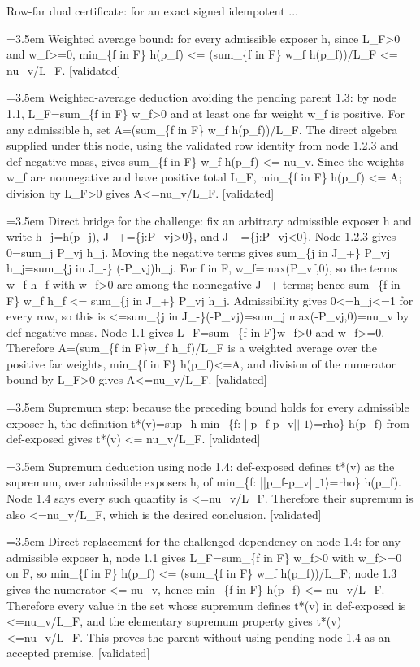 \documentclass{article}
\newcommand{\step}[1]{\par\noindent\hangindent=3.5em\hangafter=1%
  \makebox[3.5em][l]{\textbf{#1.}}}
\newcommand{\steptag}[1]{\hfill{\small\textsf{[#1]}}}
\begin{document}
\begin{proofbox}{Row-far dual certificate: for an exact signed idempotent ...}
\step{1.4} Weighted average bound: for every admissible exposer h, since L\_F>0 and w\_f>=0, min\_\{f in F\} h(p\_f) <= (sum\_\{f in F\} w\_f h(p\_f))/L\_F <= nu\_v/L\_F. \steptag{validated} \\[6pt]
\step{1.4.1} Weighted-average deduction avoiding the pending parent 1.3: by node 1.1, L\_F=sum\_\{f in F\} w\_f>0 and at least one far weight w\_f is positive. For any admissible h, set A=(sum\_\{f in F\} w\_f h(p\_f))/L\_F. The direct algebra supplied under this node, using the validated row identity from node 1.2.3 and def-negative-mass, gives sum\_\{f in F\} w\_f h(p\_f) <= nu\_v. Since the weights w\_f are nonnegative and have positive total L\_F, min\_\{f in F\} h(p\_f) <= A; division by L\_F>0 gives A<=nu\_v/L\_F. \steptag{validated} \\[6pt]
\step{1.4.1.1} Direct bridge for the challenge: fix an arbitrary admissible exposer h and write h\_j=h(p\_j), J\_+=\{j:P\_vj>0\}, and J\_-=\{j:P\_vj<0\}. Node 1.2.3 gives 0=sum\_j P\_vj h\_j. Moving the negative terms gives sum\_\{j in J\_+\} P\_vj h\_j=sum\_\{j in J\_-\} (-P\_vj)h\_j. For f in F, w\_f=max(P\_vf,0), so the terms w\_f h\_f with w\_f>0 are among the nonnegative J\_+ terms; hence sum\_\{f in F\} w\_f h\_f <= sum\_\{j in J\_+\} P\_vj h\_j. Admissibility gives 0<=h\_j<=1 for every row, so this is <=sum\_\{j in J\_-\}(-P\_vj)=sum\_j max(-P\_vj,0)=nu\_v by def-negative-mass. Node 1.1 gives L\_F=sum\_\{f in F\}w\_f>0 and w\_f>=0. Therefore A=(sum\_\{f in F\}w\_f h\_f)/L\_F is a weighted average over the positive far weights, min\_\{f in F\} h(p\_f)<=A, and division of the numerator bound by L\_F>0 gives A<=nu\_v/L\_F. \steptag{validated} \\[4pt]
\step{1.5} Supremum step: because the preceding bound holds for every admissible exposer h, the definition t*(v)=sup\_h min\_\{f: ||p\_f-p\_v|$|\_1\rangle$=rho\} h(p\_f) from def-exposed gives t*(v) <= nu\_v/L\_F. \steptag{validated} \\[6pt]
\step{1.5.1} Supremum deduction using node 1.4: def-exposed defines t*(v) as the supremum, over admissible exposers h, of min\_\{f: ||p\_f-p\_v|$|\_1\rangle$=rho\} h(p\_f). Node 1.4 says every such quantity is <=nu\_v/L\_F. Therefore their supremum is also <=nu\_v/L\_F, which is the desired conclusion. \steptag{validated} \\[6pt]
\step{1.5.1.1} Direct replacement for the challenged dependency on node 1.4: for any admissible exposer h, node 1.1 gives L\_F=sum\_\{f in F\} w\_f>0 with w\_f>=0 on F, so min\_\{f in F\} h(p\_f) <= (sum\_\{f in F\} w\_f h(p\_f))/L\_F; node 1.3 gives the numerator <= nu\_v, hence min\_\{f in F\} h(p\_f) <= nu\_v/L\_F. Therefore every value in the set whose supremum defines t*(v) in def-exposed is <=nu\_v/L\_F, and the elementary supremum property gives t*(v)<=nu\_v/L\_F. This proves the parent without using pending node 1.4 as an accepted premise. \steptag{validated} \\[6pt]

\end{proofbox}
\end{document}
